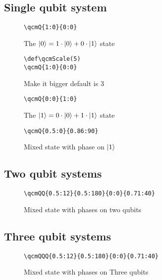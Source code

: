 \documentclass{article}
\begin{document}
\subsection*{Single qubit system}
\begin{figure}[!ht]
    \begin{verbatim}
\qcmQ{1:0}{0:0}
    \end{verbatim}
    \centering
    \caption{The $\ket{0} = 1 \cdot \ket{0} + 0 \cdot \ket{1}$ state}
\end{figure}

\begin{figure}[!ht]
    \begin{verbatim}
\def\qcmScale(5)
\qcmQ{1:0}{0:0}
    \end{verbatim}
    \centering
    \def\qcmScale{5}
    \caption{Make it bigger default is 3}
\end{figure}

\begin{figure}[!ht]
    \begin{verbatim}
\qcmQ{0:0}{1:0}
    \end{verbatim}
    \centering
    \caption{The $\ket{1} = 0 \cdot \ket{0} + 1 \cdot \ket{1}$ state}
\end{figure}

\begin{figure}[!ht]
    \begin{verbatim}
\qcmQ{0.5:0}{0.86:90}
    \end{verbatim}
    \centering
    \caption{Mixed state with phase on $\ket{1}$}
\end{figure}

\pagebreak
\subsection*{Two qubit systems}
\begin{figure}[!ht]
    \begin{verbatim}
\qcmQQ{0.5:12}{0.5:180}{0:0}{0.71:40}
    \end{verbatim}
    \centering
    \caption{Mixed state with phases on two qubits}
\end{figure}

\pagebreak
\subsection*{Three qubit systems}
\begin{figure}[!ht]
    \begin{verbatim}
\qcmQQQ{0.5:12}{0.5:180}{0:0}{0.71:40}
    \end{verbatim}
    \centering
    \def\qcmScale{2}
    \caption{Mixed state with phases on Three qubits}
\end{figure}
\end{document}
